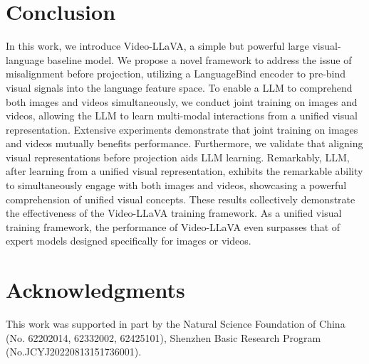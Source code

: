 \section{Conclusion}
\label{sec:conclu}
In this work, we introduce Video-LLaVA, a simple but powerful large visual-language baseline model. We propose a novel framework to address the issue of misalignment before projection, utilizing a LanguageBind encoder to pre-bind visual signals into the language feature space. To enable a LLM to comprehend both images and videos simultaneously, we conduct joint training on images and videos, allowing the LLM to learn multi-modal interactions from a unified visual representation. Extensive experiments demonstrate that joint training on images and videos mutually benefits performance. Furthermore, we validate that aligning visual representations before projection aids LLM learning. Remarkably, LLM, after learning from a unified visual representation, exhibits the remarkable ability to simultaneously engage with both images and videos, showcasing a powerful comprehension of unified visual concepts. These results collectively demonstrate the effectiveness of the Video-LLaVA training framework. As a unified visual training framework, the performance of Video-LLaVA even surpasses that of expert models designed specifically for images or videos.

\section*{Acknowledgments}

This work was supported in part by the Natural Science Foundation of China (No. 62202014, 62332002, 62425101), Shenzhen Basic Research Program (No.JCYJ20220813151736001).

\clearpage

\clearpage

